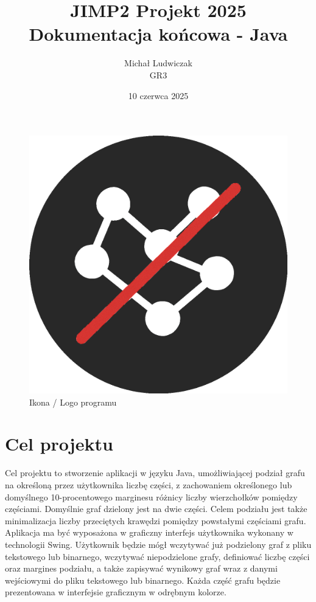 \documentclass{article}
\title{\Huge JIMP2 Projekt 2025 \\ {\huge Dokumentacja końcowa - Java}}
\author{Michał Ludwiczak \\ GR3}
\date{10 czerwca 2025}
\begin{document}
\maketitle

\tableofcontents


\begin{figure} [H]
    \centering
    \includegraphics[width=0.5\linewidth]{img/icon_dark.png}
    \caption{Ikona / Logo programu}
    \label{fig:icon_dark}
\end{figure}



\section{Cel projektu}

    Cel projektu to stworzenie aplikacji w języku Java, umożliwiającej podział grafu na określoną przez użytkownika liczbę części, z zachowaniem określonego lub domyślnego 10-procentowego marginesu różnicy liczby wierzchołków pomiędzy częściami. Domyślnie graf dzielony jest na dwie części. Celem podziału jest także minimalizacja liczby przeciętych krawędzi pomiędzy powstałymi częściami grafu. 
    Aplikacja ma być wyposażona w graficzny interfejs użytkownika wykonany w technologii Swing. Użytkownik będzie mógł wczytywać już podzielony graf z pliku tekstowego lub binarnego, wczytywać niepodzielone grafy, definiować liczbę części oraz margines podziału, a także zapisywać wynikowy graf wraz z danymi wejściowymi do pliku tekstowego lub binarnego. 
    Każda część grafu będzie prezentowana w interfejsie graficznym w odrębnym kolorze.
    
\end{document}

